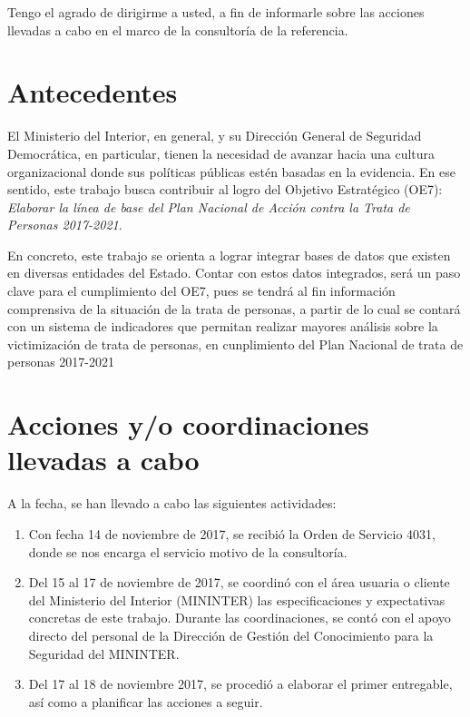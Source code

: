 \documentclass[a4paper,12pt]{texMemo} %
\begin{document}


\clearpage\maketitle
\thispagestyle{empty}

Tengo el agrado de dirigirme a usted, a fin de informarle sobre las acciones llevadas a cabo en el marco de la consultoría de la referencia. 

\section{Antecedentes}

El Ministerio del Interior, en general, y su Dirección General de Seguridad Democrática, en particular, tienen la necesidad de avanzar hacia una cultura organizacional donde sus políticas públicas estén basadas en la evidencia. En ese sentido, este trabajo busca contribuir al logro del Objetivo Estratégico  (OE7): \emph{Elaborar la línea de base del Plan Nacional de Acción contra la Trata de Personas 2017-2021}.

En concreto, este trabajo se orienta a lograr integrar bases de datos que existen en diversas entidades del Estado. Contar con estos datos integrados, será un paso clave para el cumplimiento del OE7, pues se tendrá al fin información comprensiva de la situación de la trata de personas, a partir de lo cual se contará con un sistema de indicadores que permitan realizar mayores análisis sobre la victimización de trata de personas, en cunplimiento del Plan Nacional de trata de personas 2017-2021

\section{Acciones y/o coordinaciones llevadas a cabo}

A la fecha, se han llevado a cabo las siguientes actividades:

\begin{enumerate}
\item Con fecha 14 de noviembre de 2017, se recibió la Orden de Servicio 4031, donde se nos encarga el servicio motivo de la consultoría.

\item Del 15 al 17 de noviembre de 2017, se coordinó con el área usuaria o cliente del Ministerio del Interior (MININTER) las especificaciones y expectativas concretas de este trabajo. Durante las coordinaciones, se contó con el apoyo directo del personal de la Dirección de Gestión del Conocimiento para la Seguridad del MININTER.


\item Del 17 al 18 de noviembre 2017, se procedió a elaborar el primer entregable, así como a planificar las acciones a seguir.

\end{enumerate}
\end{document}
